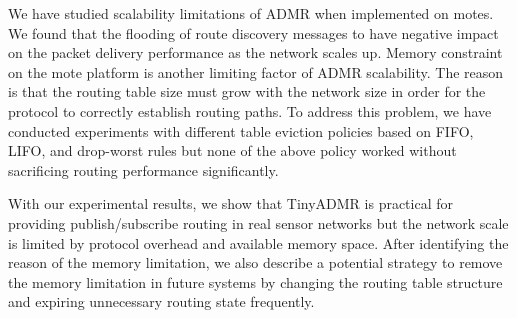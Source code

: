 We have studied scalability limitations of ADMR when implemented on
motes. We found that the flooding of route discovery messages to have negative
impact on the packet delivery performance as the network scales up. 
Memory constraint on the mote platform is another
limiting factor of ADMR scalability. The reason is that the routing table size
must grow with the network size in order for the protocol to correctly
establish routing paths. To address this problem, we have conducted experiments with different table eviction policies based
on FIFO, LIFO, and drop-worst rules but none of the above policy
worked without sacrificing routing performance significantly.

With our experimental results, we show that TinyADMR is practical for
providing publish/subscribe routing in real sensor networks but the network
scale is limited by protocol overhead and available memory space. 
After identifying the reason of the memory limitation, we also describe a
potential strategy to remove the memory limitation in future systems by
changing the routing table structure and expiring unnecessary routing state
frequently.
